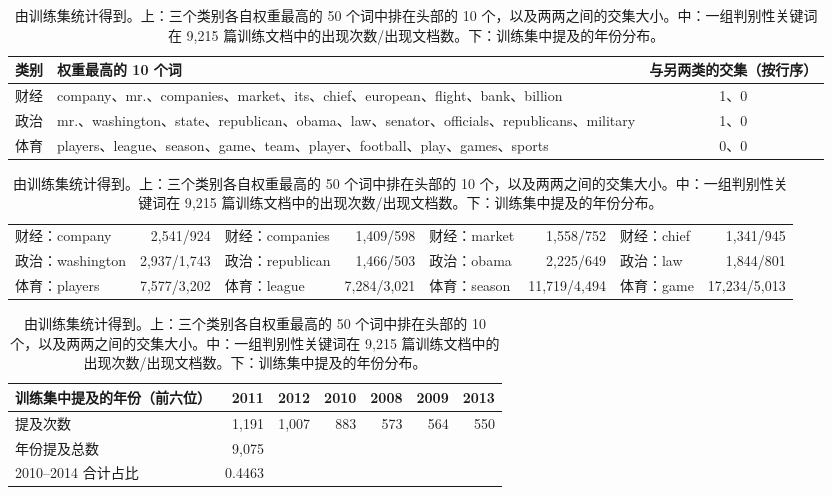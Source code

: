 \begin{table}[t]
\centering
\footnotesize
\caption{由训练集统计得到。上：三个类别各自权重最高的 50 个词中排在头部的 10 个，以及两两之间的交集大小。中：一组判别性关键词在 9{,}215 篇训练文档中的出现次数/出现文档数。下：训练集中提及的年份分布。}
\label{tab:diagnostics}
{\scriptsize
\begin{tabular}{llc}
\toprule
类别 & 权重最高的 10 个词 & 与另两类的交集（按行序） \\
\midrule
财经 & company、mr.、companies、market、its、chief、european、flight、bank、billion & 1、0 \\
政治 & mr.、washington、state、republican、obama、law、senator、officials、republicans、military & 1、0 \\
体育 & players、league、season、game、team、player、football、play、games、sports & 0、0 \\
\bottomrule
\end{tabular}
}

\vspace{6pt}
{\tiny
\begin{tabular}{lrlrlrlr}
\toprule
财经：company & 2,541/924 & 财经：companies & 1,409/598 & 财经：market & 1,558/752 & 财经：chief & 1,341/945 \\
政治：washington & 2,937/1,743 & 政治：republican & 1,466/503 & 政治：obama & 2,225/649 & 政治：law & 1,844/801 \\
体育：players & 7,577/3,202 & 体育：league & 7,284/3,021 & 体育：season & 11,719/4,494 & 体育：game & 17,234/5,013 \\
\bottomrule
\end{tabular}
}

\vspace{6pt}
\begin{tabular}{lrrrrrr}
\toprule
训练集中提及的年份（前六位） & 2011 & 2012 & 2010 & 2008 & 2009 & 2013 \\
\midrule
提及次数 & 1,191 & 1,007 & 883 & 573 & 564 & 550 \\
\midrule
年份提及总数 & 9{,}075 \\
2010--2014 合计占比 & 0.4463 &  &  &  &  &  \\
\bottomrule
\end{tabular}
\end{table}
